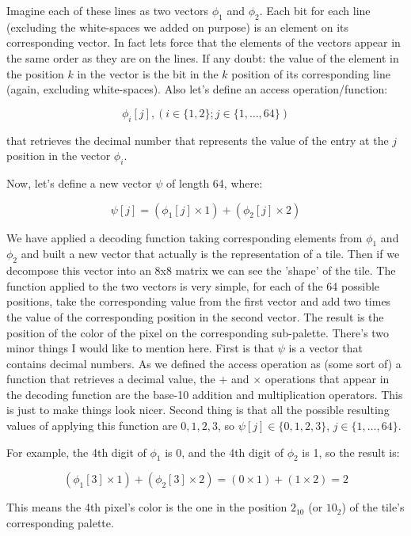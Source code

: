 \documentclass{article}
\begin{document}
Imagine each of these lines as two vectors $\phi_1$ and $\phi_2$. Each bit for each line (excluding the white-spaces we added on purpose) is an element on its corresponding vector. In fact lets force that the elements of the vectors appear in the same order as they are on the lines. If any doubt: the value of the element in the position $k$ in the vector is the bit in the $k$ position of its corresponding line (again, excluding white-spaces). Also let's define an access operation/function:

$$\phi_i[j], (i \in \{ 1, 2\}; j \in \{ 1,\dots,64\})$$ 
\vskip 0.2in

that retrieves the decimal number that represents the value of the entry at the $j$ position in the vector $\phi_i$.
\vskip 0.2in

Now, let's define a new vector $\psi$ of length 64, where:

$$ \psi[j] = (\phi_1[j] \times 1) + (\phi_2[j] \times 2) $$
\vskip 0.2in

We have applied a decoding function taking corresponding elements from $\phi_1$ and $\phi_2$ and built a new vector that actually is the representation of a tile. Then if we decompose this vector into an 8x8 matrix we can see the 'shape' of the tile. The function applied to the two vectors is very simple, for each of the 64 possible positions, take the corresponding value from the first vector and add two times the value of the corresponding position in the second vector. The result is the position of the color of the pixel on the corresponding sub-palette. There's two minor things I would like to mention here. First is that $\psi$ is a vector that contains decimal numbers. As we defined the access operation as (some sort of) a function that retrieves a decimal value, the $+$ and $\times$ operations that appear in the decoding function are the base-10 addition and multiplication operators. This is just to make things look nicer. Second thing is that all the possible resulting values of applying this function are $0,1,2,3$, so $\psi[j] \in \{ 0, 1, 2, 3\}$, $j \in \{ 1,\dots,64\}$. 
\vskip 0.2in

For example, the 4th digit of $\phi_1$ is 0, and the 4th digit of $\phi_2$ is 1, so the result is: 

$$(\phi_1[3] \times 1) + (\phi_2[3] \times 2)  = (0 \times 1) + (1 \times 2) = 2$$
\vskip 0.2in

This means the 4th pixel's color is the one in the position $2_{10}$ (or $10_2$) of the tile's corresponding palette. 
\end{document}
